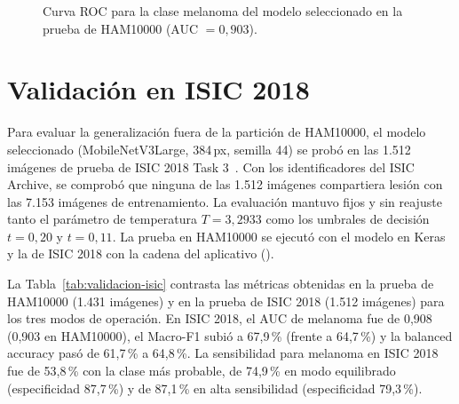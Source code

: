 \begin{figure}[H]
  \centering
  \caption{Curva ROC para la clase melanoma del modelo seleccionado en la prueba de HAM10000 (AUC $= 0{,}903$).}
  \label{fig:roc-melanoma}
\end{figure}

\section{Validación en ISIC 2018}

Para evaluar la generalización fuera de la partición de HAM10000, el modelo seleccionado (MobileNetV3Large, 384\,px, semilla 44) se probó en las 1.512 imágenes de prueba de ISIC 2018 Task 3~\cite{codella2019isic2018}. Con los identificadores del ISIC Archive, se comprobó que ninguna de las 1.512 imágenes compartiera lesión con las 7.153 imágenes de entrenamiento. La evaluación mantuvo fijos y sin reajuste tanto el parámetro de temperatura $T = 3{,}2933$ como los umbrales de decisión $t = 0{,}20$ y $t = 0{,}11$. La prueba en HAM10000 se ejecutó con el modelo en Keras y la de ISIC 2018 con la cadena del aplicativo ().

La Tabla~\ref{tab:validacion-isic} contrasta las métricas obtenidas en la prueba de HAM10000 (1.431 imágenes) y en la prueba de ISIC 2018 (1.512 imágenes) para los tres modos de operación. En ISIC 2018, el AUC de melanoma fue de 0,908 (0,903 en HAM10000), el Macro-F1 subió a 67,9\,\% (frente a 64,7\,\%) y la balanced accuracy pasó de 61,7\,\% a 64,8\,\%. La sensibilidad para melanoma en ISIC 2018 fue de 53,8\,\% con la clase más probable, de 74,9\,\% en modo equilibrado (especificidad 87,7\,\%) y de 87,1\,\% en alta sensibilidad (especificidad 79,3\,\%).

